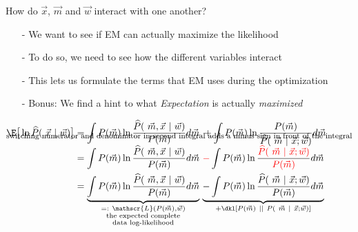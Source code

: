 \begin{frame}{How do $\vec x$, $\vec m$ and $\vec w$ interact with one another?}
{

\begin{itemize}
\item[-] We want to see if EM can actually maximize the likelihood
\item[-] To do so, we need to see how the different variables interact
\item[-] This lets us formulate the terms that EM uses during the optimization
\item[-] Bonus: We find a hint to what \emph{Expectation} is actually \emph{maximized}
\end{itemize}
}

\end{frame}

\begin{frame}{\subsecname}

\svspace{-5mm}


\svspace{-5mm}

\begingroup
\small
\begin{align}
\E
\big\lbrack
\ln \widehat{P}(~\vec x ~|~ \vec w)
\big\rbrack
&= \int P(\vec m) \ln \frac{\widehat{P}(~\vec m, \vec x ~|~ \vec w)}{P(\vec m)} d\vec m 
\;+ \int P(\vec m) \ln \frac{P(\vec m)}{\widehat{P}(~\vec m~|~\vec x;\vec w)} d\vec m\slidesonly{\\[-7mm]}
\intertext{\footnotesize switching numerator and denominator in second integral adds a minus sign in front of the integral}
&= \int P(\vec m) \ln  \frac{\widehat{P}(~\vec m, \vec x ~|~ \vec w)}{P(\vec m)} d\vec m
~
{\color{red}-} \int P(\vec m) \ln \frac{\color{red}\widehat{P}(~\vec m~|~\vec x;\vec w)}{\color{red}P(\vec m)} d\vec m \\ 
&= 
\underbrace{\int P(\vec m) \ln \frac{\widehat{P}(~\vec m, \vec x ~|~ \vec w)}{P(\vec m)} d\vec m
}_{\substack{=:~\mathscr{L}(P(\vec m), \vec w)\\\text{the expected complete}\\\text{data log-likelihood}}}
\,
\underbrace{-\int P(\vec m) \ln \frac{\widehat{P}(~\vec m~|~\vec x;\vec w)}{P(\vec m)} d\vec m
}_{+\dkl \left\lbrack P(\vec m) ~||~ P(~\vec m~|~ \vec x; \vec w) \right\rbrack}
\end{align}
\endgroup

\end{frame}

